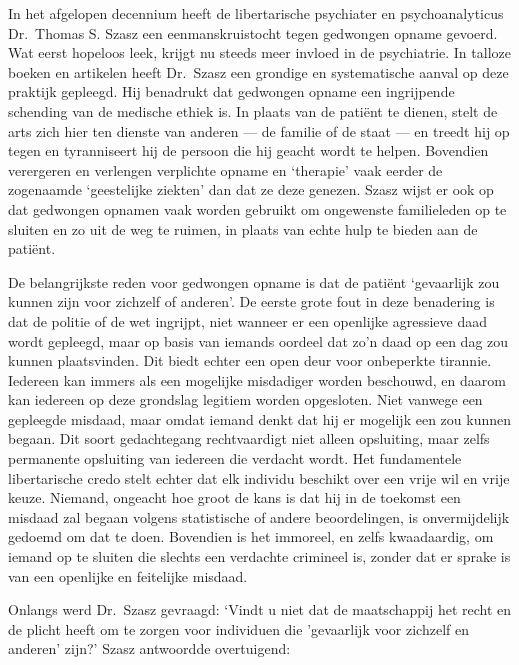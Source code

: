 \documentclass[
  a5paper,
  smalldemyvopaper,10pt,twoside,onecolumn,openright,extrafontsizes,hidelinks]{memoir}
\begin{document}
In het afgelopen decennium heeft de libertarische psychiater en
psychoanalyticus Dr.~Thomas S. Szasz een eenmanskruistocht tegen
gedwongen opname gevoerd. Wat eerst hopeloos leek, krijgt nu steeds meer
invloed in de psychiatrie. In talloze boeken en artikelen heeft
Dr.~Szasz een grondige en systematische aanval op deze praktijk
gepleegd. Hij benadrukt dat gedwongen opname een ingrijpende schending
van de medische ethiek is. In plaats van de patiënt te dienen, stelt de
arts zich hier ten dienste van anderen --- de familie of de staat --- en
treedt hij op tegen en tyranniseert hij de persoon die hij geacht wordt
te helpen. Bovendien verergeren en verlengen verplichte opname en
`therapie' vaak eerder de zogenaamde `geestelijke ziekten' dan dat ze
deze genezen. Szasz wijst er ook op dat gedwongen opnamen vaak worden
gebruikt om ongewenste familieleden op te sluiten en zo uit de weg te
ruimen, in plaats van echte hulp te bieden aan de patiënt.

De belangrijkste reden voor gedwongen opname is dat de patiënt
`gevaarlijk zou kunnen zijn voor zichzelf of anderen'. De eerste grote
fout in deze benadering is dat de politie of de wet ingrijpt, niet
wanneer er een openlijke agressieve daad wordt gepleegd, maar op basis
van iemands oordeel dat zo'n daad op een dag zou kunnen plaatsvinden.
Dit biedt echter een open deur voor onbeperkte tirannie. Iedereen kan
immers als een mogelijke misdadiger worden beschouwd, en daarom kan
iedereen op deze grondslag legitiem worden opgesloten. Niet vanwege een
gepleegde misdaad, maar omdat iemand denkt dat hij er mogelijk een zou
kunnen begaan. Dit soort gedachtegang rechtvaardigt niet alleen
opsluiting, maar zelfs permanente opsluiting van iedereen die verdacht
wordt. Het fundamentele libertarische credo stelt echter dat elk
individu beschikt over een vrije wil en vrije keuze. Niemand, ongeacht
hoe groot de kans is dat hij in de toekomst een misdaad zal begaan
volgens statistische of andere beoordelingen, is onvermijdelijk gedoemd
om dat te doen. Bovendien is het immoreel, en zelfs kwaadaardig, om
iemand op te sluiten die slechts een verdachte crimineel is, zonder dat
er sprake is van een openlijke en feitelijke misdaad.

Onlangs werd Dr.~Szasz gevraagd: `Vindt u niet dat de maatschappij het
recht en de plicht heeft om te zorgen voor individuen die 'gevaarlijk
voor zichzelf en anderen' zijn?' Szasz antwoordde overtuigend:
\end{document}
